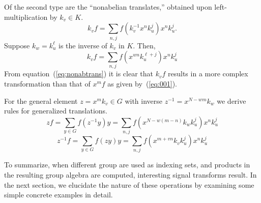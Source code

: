 \documentclass[reqno,onecolumn,oneside]{paper}
\newcommand{\<}{\ensuremath{\langle}}
\renewcommand{\>}{\ensuremath{\rangle}}
\newcommand{\zmv}{\ensuremath{x^m k_v}}
\newcommand{\zmvInv}{\ensuremath{x^{N-wm} k_w}}
\begin{document}
Of the second type are the ``nonabelian translates,'' 
obtained upon left-multiplication by $k_v \in K$.
\begin{equation}
  k_vf %
  = \sum_{n,j} f(k_v^{-1}x^n k_u^j)x^n k_u^j.
\end{equation}
Suppose $k_w = k_u^\ell$ is the inverse of $k_v$ in $K$.  Then,
\begin{equation}
  k_vf %
  = \sum_{n,j} f(x^{wn}k_u^{\ell + j})x^n k_u^j\label{eq:nonabtrans}
\end{equation}
From equation~(\ref{eq:nonabtrans}) it is clear that $k_vf$ 
results in a more complex transformation than that of 
$x^m f$ as given by~(\ref{eq:001}).


For the general element $z = \zmv \in G$ with 
inverse $z^{-1}=\zmvInv$ %
we derive rules for generalized translations.
\begin{equation*}
  zf = \sum_{y\in G} f(z^{-1}y)y= \sum_{n,j} f(x^{N-w(m-n)} k_w k_u^j)x^n k_u^j
\end{equation*}
\begin{equation*}
  z^{-1}f = \sum_{y\in G} f(zy)y= \sum_{n,j} f(x^{m+vn} k_vk_u^j)x^n k_u^j
\end{equation*}


To summarize, when different group are used as indexing sets,
and products in the resulting group algebra are computed, 
interesting signal transforms result.  In the next section,
we elucidate the nature of these operations by
examining some simple concrete examples in detail.

%
\end{document}

